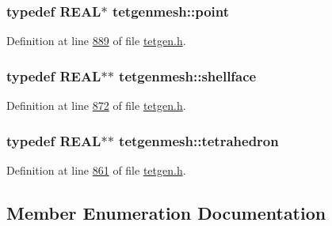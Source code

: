 \subsubsection[{\texorpdfstring{point}{point}}]{\setlength{\rightskip}{0pt plus 5cm}typedef {\bf R\+E\+AL}$\ast$ {\bf tetgenmesh\+::point}}\hypertarget{classtetgenmesh_ace3fb4f80389185b7c9b18ab69a3dea2}{}\label{classtetgenmesh_ace3fb4f80389185b7c9b18ab69a3dea2}


Definition at line \hyperlink{tetgen_8h_source_l00889}{889} of file \hyperlink{tetgen_8h_source}{tetgen.\+h}.

\subsubsection[{\texorpdfstring{shellface}{shellface}}]{\setlength{\rightskip}{0pt plus 5cm}typedef {\bf R\+E\+AL}$\ast$$\ast$ {\bf tetgenmesh\+::shellface}}\hypertarget{classtetgenmesh_ad4860123b88783b943fa6452e886a2cb}{}\label{classtetgenmesh_ad4860123b88783b943fa6452e886a2cb}


Definition at line \hyperlink{tetgen_8h_source_l00872}{872} of file \hyperlink{tetgen_8h_source}{tetgen.\+h}.

\subsubsection[{\texorpdfstring{tetrahedron}{tetrahedron}}]{\setlength{\rightskip}{0pt plus 5cm}typedef {\bf R\+E\+AL}$\ast$$\ast$ {\bf tetgenmesh\+::tetrahedron}}\hypertarget{classtetgenmesh_a6a12b1c0d1834ca941d16c62e949e5e3}{}\label{classtetgenmesh_a6a12b1c0d1834ca941d16c62e949e5e3}


Definition at line \hyperlink{tetgen_8h_source_l00861}{861} of file \hyperlink{tetgen_8h_source}{tetgen.\+h}.



\subsection{Member Enumeration Documentation}

